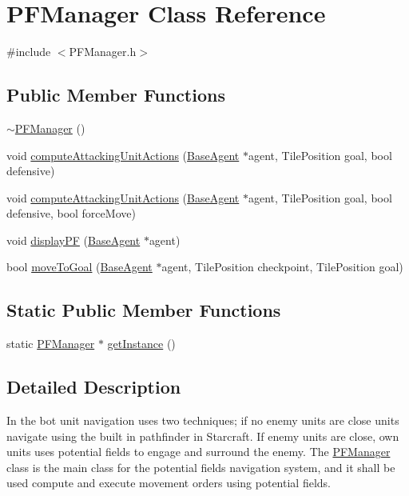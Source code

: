 \hypertarget{class_p_f_manager}{
\section{PFManager Class Reference}
\label{class_p_f_manager}
}


{\ttfamily \#include $<$PFManager.h$>$}

\subsection*{Public Member Functions}
\begin{DoxyCompactItemize}
\item 
\hyperlink{class_p_f_manager_a04f2602085897ac33710160724c2171c}{$\sim$PFManager} ()
\item 
void \hyperlink{class_p_f_manager_a3a9ab60146bf43535e85c3bf8e286022}{computeAttackingUnitActions} (\hyperlink{class_base_agent}{BaseAgent} $\ast$agent, TilePosition goal, bool defensive)
\item 
void \hyperlink{class_p_f_manager_a350d3168c841259608c52959947538de}{computeAttackingUnitActions} (\hyperlink{class_base_agent}{BaseAgent} $\ast$agent, TilePosition goal, bool defensive, bool forceMove)
\item 
void \hyperlink{class_p_f_manager_af7866c8608e6905568d7f0b8246bef6e}{displayPF} (\hyperlink{class_base_agent}{BaseAgent} $\ast$agent)
\item 
bool \hyperlink{class_p_f_manager_aa107984ee233c0847cb1e4c2a1b0c070}{moveToGoal} (\hyperlink{class_base_agent}{BaseAgent} $\ast$agent, TilePosition checkpoint, TilePosition goal)
\end{DoxyCompactItemize}
\subsection*{Static Public Member Functions}
\begin{DoxyCompactItemize}
\item 
static \hyperlink{class_p_f_manager}{PFManager} $\ast$ \hyperlink{class_p_f_manager_a4f6a01d09a9896e38d2a34c03d57de56}{getInstance} ()
\end{DoxyCompactItemize}


\subsection{Detailed Description}
In the bot unit navigation uses two techniques; if no enemy units are close units navigate using the built in pathfinder in Starcraft. If enemy units are close, own units uses potential fields to engage and surround the enemy. The \hyperlink{class_p_f_manager}{PFManager} class is the main class for the potential fields navigation system, and it shall be used compute and execute movement orders using potential fields.

